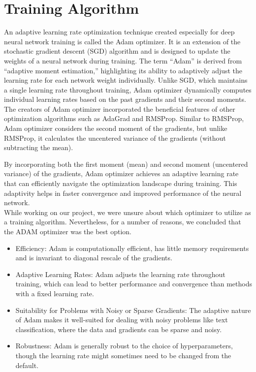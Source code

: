 \section{Training Algorithm}
An adaptive learning rate optimization technique created especially for deep neural network training is called the Adam optimizer. It is an extension of the stochastic gradient descent (SGD) algorithm and is designed to update the weights of a neural network during training. The term “Adam” is derived from “adaptive moment estimation,” highlighting its ability to adaptively adjust the learning rate for each network weight individually. Unlike SGD, which maintains a single learning rate throughout training, Adam optimizer dynamically computes individual learning rates based on the past gradients and their second moments.
The creators of Adam optimizer incorporated the beneficial features of other optimization algorithms such as AdaGrad and RMSProp. Similar to RMSProp, Adam optimizer considers the second moment of the gradients, but unlike RMSProp, it calculates the uncentered variance of the gradients (without subtracting the mean).

By incorporating both the first moment (mean) and second moment (uncentered variance) of the gradients, Adam optimizer achieves an adaptive learning rate that can efficiently navigate the optimization landscape during training. This adaptivity helps in faster convergence and improved performance of the neural network.\\

While working on our project, we were unsure about which optimizer to utilize as a training algorithm. Nevertheless, for a number of reasons, we concluded that the ADAM optimizer was the best option.
\begin{itemize}
	\item Efficiency: Adam is computationally efficient, has little memory requirements and is invariant to diagonal rescale of the gradients.
	
	\item Adaptive Learning Rates: Adam adjusts the learning rate throughout training, which can lead to better performance and convergence than methods with a fixed learning rate.
	
	\item Suitability for Problems with Noisy or Sparse Gradients: The adaptive nature of Adam makes it well-suited for dealing with noisy problems like text classification, where the data and gradients can be sparse and noisy.
	
	\item Robustness: Adam is generally robust to the choice of hyperparameters, though the learning rate might sometimes need to be changed from the default.
\end{itemize}


